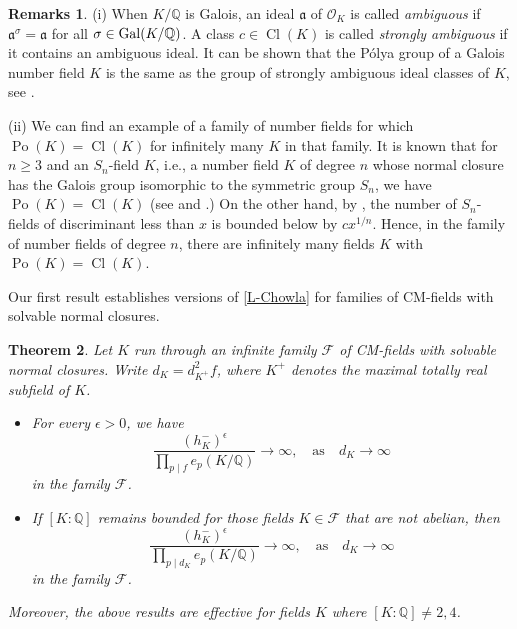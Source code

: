 \documentclass[12pt]{amsart}
\newtheorem{theorem}{Theorem}[section]
\theoremstyle{definition}
\newtheorem{notes}[theorem]{Remarks}
\numberwithin{equation}{section}
\DeclareMathOperator{\Po}{Po}
\DeclareMathOperator{\Cl}{Cl}
\begin{document}
{\begin{notes}
(i) When $K/\mathbb{Q}$ is Galois, an ideal $\mathfrak{a}$ of $\mathcal{O}_K$ is called \emph{ambiguous} if $\mathfrak{a}^\sigma=\mathfrak{a}$ for all $\sigma\in {\rm Gal}(K/\mathbb{Q})$. A class $c\in \Cl(K)$ is called \emph{strongly ambiguous} 
if it contains an ambiguous ideal. It can be shown that the P\'{o}lya group of a Galois number field $K$ is the same as the group of strongly ambiguous ideal classes of $K$, see \cite[p. 10]{Zantema}.


(ii) We can find an example of a family of number fields for which $\Po(K)=\Cl(K)$ for infinitely many $K$ in that family. It is known that for $n \geq 3$ and an $S_n$-field $K$, 
i.e., a number field $K$ of degree $n$ whose normal closure has the Galois group isomorphic to the symmetric group $S_n$, we have $\Po(K)=\Cl(K)$ (see \cite[Theorem 4.1]{ChabertII} and \cite[Theorem 3.10]{Abbas}.) On the other hand, by \cite[Proposition 6.2]{Malle}, the number of $S_n$-fields of discriminant less than $x$ is bounded below by $cx^{1/n}$. Hence, in the family of number fields of degree $n$, there are infinitely many fields $K$ with $\Po(K)=\Cl(K)$.
\end{notes}
}

Our first result establishes versions of \eqref{L-Chowla} for families of CM-fields with solvable normal closures.

\begin{theorem} 
\label{theorem,CM}
Let $K$ run through an  {infinite} family $\mathcal{F}$ of CM-fields with solvable normal closures.
Write $d_K=d_{K^+}^2f$, where $K^+$ denotes the maximal totally real subfield of $K$.
\begin{itemize}
\item[(i)]  For every $\epsilon >0$, we have
\begin{equation*}
	\frac{(h_K^-)^{\epsilon}}{\prod_{p \mid f}e_p(K/\mathbb{Q})} \rightarrow \infty,  \quad \text{as} \quad d_K \rightarrow \infty	
\end{equation*}
in the family $\mathcal{F}$.
\item[(ii)] If $[K:\mathbb{Q}]$ remains bounded for those fields $K \in \mathcal{F}$ that are not abelian, then
\begin{equation*}
	\frac{(h_K^-)^{\epsilon}}{\prod_{p \mid d_K}e_p(K/\mathbb{Q})} \rightarrow \infty,  \quad \text{as} \quad d_K \rightarrow \infty
\end{equation*} 
in the family $\mathcal{F}$. 
\end{itemize}

\noindent
Moreover, the above results are effective for fields $K$ where $[K:\mathbb{Q}]\neq 2, 4$.
\end{theorem}
\end{document}
